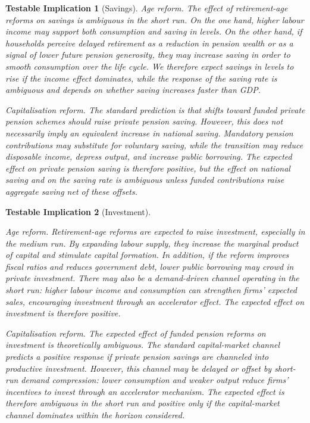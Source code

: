 \documentclass[11pt,english,a4paper, twoside, authoryear]{article}
\newtheorem{testable}{Testable Implication}}
\begin{document}
\begin{testable}[Savings]\label{test:sav}
\emph{Age reform.} The effect of retirement-age reforms on savings is ambiguous in the short run. On the one hand, higher labour income may support both consumption and saving in levels. On the other hand, if households perceive delayed retirement as a reduction in pension wealth or as a signal of lower future pension generosity, they may increase saving in order to smooth consumption over the life cycle. We therefore expect savings in levels to rise if the income effect dominates, while the response of the saving rate is ambiguous and depends on whether saving increases faster than GDP.

\emph{Capitalisation reform.} The standard prediction is that shifts toward funded private pension schemes should raise private pension saving. However, this does not necessarily imply an equivalent increase in national saving. Mandatory pension contributions may substitute for voluntary saving, while the transition may reduce disposable income, depress output, and increase public borrowing. The expected effect on private pension saving is therefore positive, but the effect on national saving and on the saving rate is ambiguous unless funded contributions raise aggregate saving net of these offsets.

\end{testable}



\begin{testable}[Investment]\label{test:inv}

\emph{Age reform.} Retirement-age reforms are expected to raise investment, especially in the medium run. By expanding labour supply, they increase the marginal product of capital and stimulate capital formation. In addition, if the reform improves fiscal ratios and reduces government debt, lower public borrowing may crowd in private investment. There may also be a demand-driven channel operating in the short run: higher labour income and consumption can strengthen firms' expected sales, encouraging investment through an accelerator effect. The expected effect on investment is therefore positive.

\emph{Capitalisation reform.} The expected effect of funded pension reforms on investment is theoretically ambiguous. The standard capital-market channel predicts a positive response if private pension savings are channeled into productive investment. However, this channel may be delayed or offset by short-run demand compression: lower consumption and weaker output reduce firms' incentives to invest through an accelerator mechanism. The expected effect is therefore ambiguous in the short run and positive only if the capital-market channel dominates within the horizon considered.

\end{testable}
\end{document}
